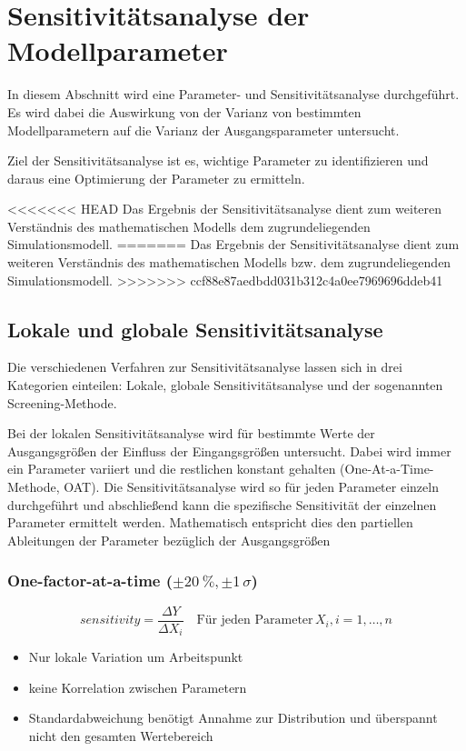 \pagestyle{milan}
\section{Sensitivitätsanalyse der Modellparameter}\label{sec:sesitivitaetsanalyse}
In diesem Abschnitt wird eine Parameter- und Sensitivitätsanalyse durchgeführt. 
Es wird dabei die Auswirkung von der Varianz von bestimmten Modellparametern auf die Varianz der Ausgangsparameter untersucht.

Ziel der Sensitivitätsanalyse ist es, wichtige Parameter zu identifizieren und daraus eine Optimierung der Parameter zu ermitteln.

<<<<<<< HEAD
Das Ergebnis der Sensitivitätsanalyse dient zum weiteren Verständnis des mathematischen Modells \bzw dem zugrundeliegenden Simulationsmodell.
=======
Das Ergebnis der Sensitivitätsanalyse dient zum weiteren Verständnis des mathematischen Modells bzw. dem zugrundeliegenden Simulationsmodell.
>>>>>>> ccf88e87aedbdd031b312c4a0ee7969696ddeb41
\subsection{Lokale und globale Sensitivitätsanalyse}

Die verschiedenen Verfahren zur Sensitivitätsanalyse lassen sich in drei Kategorien einteilen: Lokale, globale Sensitivitätsanalyse und der sogenannten Screening-Methode.

Bei der lokalen Sensitivitätsanalyse wird für bestimmte Werte der Ausgangsgrößen der Einfluss der Eingangsgrößen untersucht. Dabei wird immer ein Parameter variiert und die restlichen konstant gehalten (One-At-a-Time-Methode, OAT).
Die Sensitivitätsanalyse wird so für jeden Parameter einzeln durchgeführt und abschließend kann die spezifische Sensitivität der einzelnen Parameter ermittelt werden.
Mathematisch entspricht dies den partiellen Ableitungen der Parameter bezüglich der Ausgangsgrößen

\subsubsection*{One-factor-at-a-time ($\pm \SI{20}{\percent}, \pm 1\, \sigma$)}

\begin{equation}
    sensitivity=\frac{\Delta Y}{\Delta X_{i}} \quad \textrm{Für jeden Parameter}\,X_i, i=1,\dots,n
\end{equation}
\begin{itemize}
    \item Nur lokale Variation um Arbeitspunkt 
    \item keine Korrelation zwischen Parametern
    \item Standardabweichung benötigt Annahme zur Distribution und überspannt nicht den gesamten Wertebereich
\end{itemize}

